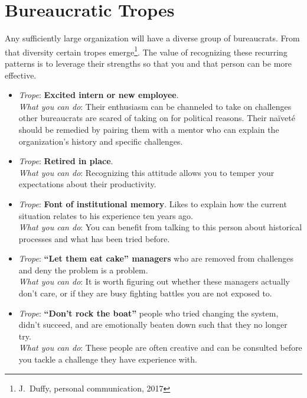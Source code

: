 \section{Bureaucratic Tropes\label{sec:tropes}}

Any sufficiently large organization will have a diverse group of bureaucrats. From that diversity certain tropes emerge\footnote{J.~Duffy, personal communication, 2017}. The value of recognizing these recurring patterns is to leverage their strengths so that you and that person can be more effective. 


\begin{itemize}
    \item \textit{Trope}: \textbf{Excited intern or new employee}. \\
    \textit{What you can do}: Their enthusiasm can be channeled to take on challenges other bureaucrats are scared of taking on for political reasons. Their na\"ivet\'e 
    should be remedied by pairing them with a mentor who can explain the organization's history and specific challenges.
    
    \item \textit{Trope}: \textbf{Retired in place}. \\
    \textit{What you can do}: Recognizing this attitude allows you to temper your expectations about their productivity. 
    
    \item \textit{Trope}: \textbf{Font of institutional memory}. Likes to explain how the current situation relates to his experience ten years ago. \\
    \textit{What you can do}: You can benefit from talking to this person about historical processes and what has been tried before. 
    
    \item \textit{Trope}: \textbf{``Let them eat cake'' managers} who are removed from challenges and deny the problem is a problem. \\
    \textit{What you can do}: It is worth figuring out whether these managers actually don't care, or if they are busy fighting battles you are not exposed to.
    
    \item \textit{Trope}: \textbf{``Don't rock the boat''} people who tried changing the system, didn't succeed, and are emotionally beaten down such that they no longer try. \\
    \textit{What you can do}: These people are often creative and can be consulted before you tackle a challenge they have experience with. 
    

\end{itemize}
